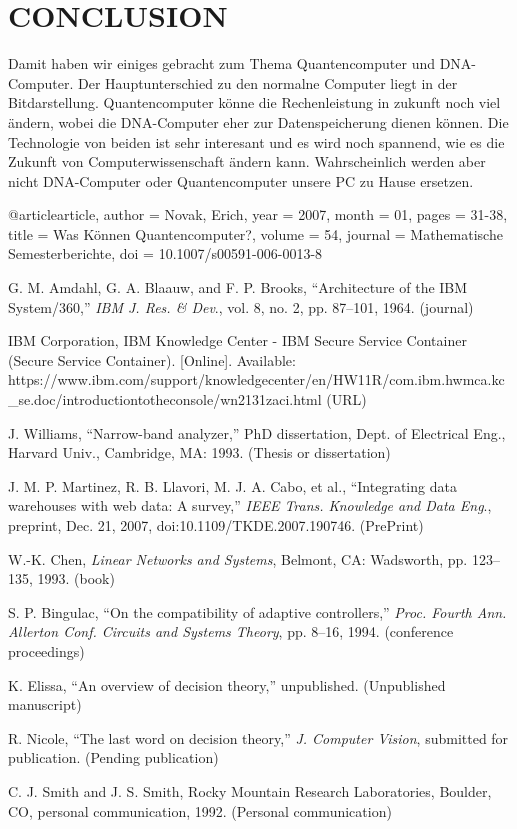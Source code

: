 \documentclass{IEEEcsmag}
\begin{document}
\section{CONCLUSION}
Damit haben wir einiges gebracht zum Thema Quantencomputer und DNA-Computer. Der Hauptunterschied zu den normalne Computer liegt in der Bitdarstellung. Quantencomputer könne die Rechenleistung in zukunft noch viel ändern, wobei die DNA-Computer eher zur Datenspeicherung dienen können. Die Technologie von beiden ist sehr interesant und es wird noch spannend, wie es die Zukunft von Computerwissenschaft ändern kann. Wahrscheinlich werden aber nicht DNA-Computer oder Quantencomputer unsere PC zu Hause ersetzen.



\begin{thebibliography}{1}

@article{article,
author = {Novak, Erich},
year = {2007},
month = {01},
pages = {31-38},
title = {Was Können Quantencomputer?},
volume = {54},
journal = {Mathematische Semesterberichte},
doi = {10.1007/s00591-006-0013-8}
}

G. M. Amdahl, G. A. Blaauw, and F. P. Brooks, ``Architecture of the IBM System/360,'' {\it IBM J. Res. \& Dev}., vol. 8, no. 2, pp. 87--101, 1964. (journal)

IBM Corporation, IBM Knowledge Center - IBM Secure Service Container (Secure Service Container). [Online]. Available: {https://www.ibm.com/support/\break knowledgecenter/en/HW11R/com.ibm.hwmca.kc\_se.doc/\break introductiontotheconsole/wn2131zaci.html} (URL)

J. Williams, ``Narrow-band analyzer,'' PhD dissertation, Dept. of Electrical Eng., Harvard Univ., Cambridge, MA: 1993. (Thesis or dissertation)

J. M. P. Martinez, R. B. Llavori, M. J. A. Cabo, et al., ``Integrating data warehouses with web data: A survey,'' {\it IEEE Trans. Knowledge and Data Eng}., preprint, Dec. 21, 2007, doi:10.1109/TKDE.2007.190746. (PrePrint)

W.-K. Chen, {\it Linear Networks and Systems}, Belmont, CA: Wadsworth, pp. 123--135, 1993. (book)

S. P. Bingulac, ``On the compatibility of adaptive controllers,'' {\it Proc. Fourth Ann. Allerton Conf. Circuits and Systems Theory}, pp. 8--16, 1994. (conference proceedings)\vadjust{\vfill\pagebreak}

K. Elissa, ``An overview of decision theory,'' unpublished. (Unpublished manuscript)

R. Nicole, ``The last word on decision theory,'' {\it J. Computer Vision}, submitted for publication. (Pending publication)

C. J. Smith and J. S. Smith, Rocky Mountain Research Laboratories, Boulder, CO, personal communication, 1992. (Personal communication)
\end{thebibliography}
\end{document}
